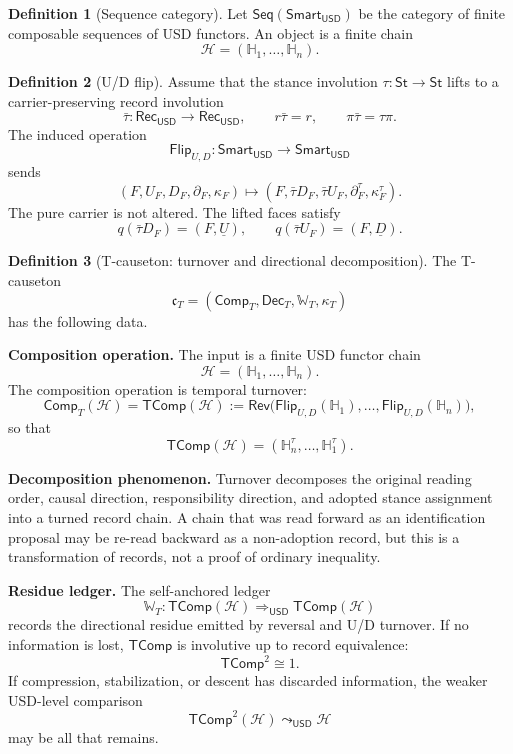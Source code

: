 \documentclass[11pt]{article}
\newcommand{\USD}{\mathsf{USD}}
\newcommand{\RecUSD}{\mathsf{Rec}_{\USD}}
\newcommand{\St}{\mathsf{St}}
\newcommand{\Smart}{\mathsf{Smart}}
\newcommand{\Seq}{\mathsf{Seq}}
\newcommand{\Rev}{\mathsf{Rev}}
\newcommand{\Flip}{\mathsf{Flip}}
\newcommand{\defeq}{\mathrel{:=}}
\newcommand{\uconn}{\mathrel{\leadsto_{\USD}}}
\newcommand{\TComp}{\mathsf{TComp}}
\newcommand{\Comp}{\mathsf{Comp}}
\newcommand{\Dec}{\mathsf{Dec}}
\theoremstyle{definition}
\newtheorem{definition}{Definition}[section]
\theoremstyle{plain}
\begin{document}
\begin{definition}[Sequence category]
Let $\Seq(\Smart_{\USD})$ be the category of finite composable sequences
of USD functors.  An object is a finite chain
\[
  \mathcal H=(\mathbb H_1,\ldots,\mathbb H_n).
\]
\end{definition}

\begin{definition}[U/D flip]
Assume that the stance involution $\tau:\St\to\St$ lifts to a
carrier-preserving record involution
\[
  \bar\tau:\RecUSD\to\RecUSD,
  \qquad
  r\bar\tau=r,
  \qquad
  \pi\bar\tau=\tau\pi.
\]
The induced operation
\[
  \Flip_{U,D}:\Smart_{\USD}\to\Smart_{\USD}
\]
sends
\[
  (F,U_F,D_F,\partial_F,\kappa_F)
  \mapsto
  (F,\bar\tau D_F,\bar\tau U_F,\partial_F^\tau,\kappa_F^\tau).
\]
The pure carrier is not altered.  The lifted faces satisfy
\[
  q(\bar\tau D_F)=(F,\underline U),
  \qquad
  q(\bar\tau U_F)=(F,\underline D).
\]
\end{definition}

\begin{definition}[T-causeton: turnover and directional decomposition]
The T-causeton
\[
  \mathfrak c_T
  =
  (\Comp_T,\Dec_T,\mathbb W_T,\kappa_T)
\]
has the following data.

\textbf{Composition operation.}  The input is a finite USD functor chain
\[
  \mathcal H=(\mathbb H_1,\ldots,\mathbb H_n).
\]
The composition operation is temporal turnover:
\[
  \Comp_T(\mathcal H)
  =
  \TComp(\mathcal H)
  \defeq
  \Rev\bigl(\Flip_{U,D}(\mathbb H_1),\ldots,
             \Flip_{U,D}(\mathbb H_n)\bigr),
\]
so that
\[
  \TComp(\mathcal H)
  =
  (\mathbb H_n^\tau,\ldots,\mathbb H_1^\tau).
\]

\textbf{Decomposition phenomenon.}  Turnover decomposes the original
reading order, causal direction, responsibility direction, and adopted
stance assignment into a turned record chain.  A chain that was read
forward as an identification proposal may be re-read backward as a
non-adoption record, but this is a transformation of records, not a proof
of ordinary inequality.

\textbf{Residue ledger.}  The self-anchored ledger
\[
  \mathbb W_T:
  \TComp(\mathcal H)\Rightarrow_{\USD}\TComp(\mathcal H)
\]
records the directional residue emitted by reversal and U/D turnover.  If
no information is lost, $\TComp$ is involutive up to record equivalence:
\[
  \TComp^2\cong 1.
\]
If compression, stabilization, or descent has discarded information, the
weaker USD-level comparison
\[
  \TComp^2(\mathcal H)\uconn \mathcal H
\]
may be all that remains.
\end{definition}
\end{document}
